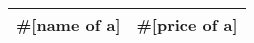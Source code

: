 \documentclass{article}
\begin{document}
\begin{center}
\begin{tabular}{ l r }
\hline

#[name of a] & #[price of a] \\ \hline
\hline
\end{tabular}
\end{center}
\end{document}
